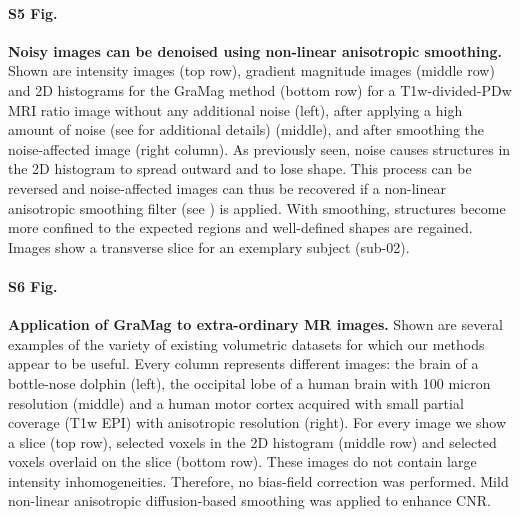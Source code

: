 \paragraph{S5 Fig.}
\label{S5_Fig}
{\bf Noisy images can be denoised using non-linear anisotropic smoothing.} Shown are intensity images (top row), gradient magnitude images (middle row) and 2D histograms for the GraMag method (bottom row) for a T1w-divided-PDw MRI ratio image without any additional noise (left), after applying a high amount of noise (see  for additional details) (middle), and after smoothing the noise-affected image (right column). As previously seen, noise causes structures in the 2D histogram to spread outward and to lose shape. This process can be reversed and noise-affected images can thus be recovered if a non-linear anisotropic smoothing filter (see \cite{Weickert1998}) is applied. With smoothing, structures become more confined to the expected regions and well-defined shapes are regained. Images show a transverse slice for an exemplary subject (sub-02).

\paragraph{S6 Fig.}
\label{S6_Fig}
{\bf Application of GraMag to extra-ordinary MR images.} Shown are several examples of the variety of existing volumetric datasets for which our methods appear to be useful. Every column represents different images: the brain of a bottle-nose dolphin \cite{Toro2014} (left), the occipital lobe of a human brain with 100 micron resolution \cite{Amunts2013} (middle) and a human motor cortex acquired with small partial coverage (T1w EPI) with anisotropic resolution \cite{Huber2017} (right). For every image we show a slice (top row), selected voxels in the 2D histogram (middle row) and selected voxels overlaid on the slice (bottom row). These images do not contain large intensity inhomogeneities. Therefore, no bias-field correction was performed. Mild non-linear anisotropic diffusion-based smoothing was applied to enhance CNR.

